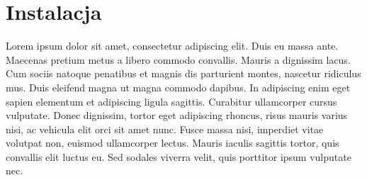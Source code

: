 \section{Instalacja}
Lorem ipsum dolor sit amet, consectetur adipiscing elit. Duis eu massa ante. Maecenas pretium metus a libero commodo convallis. Mauris a dignissim lacus. Cum sociis natoque penatibus et magnis dis parturient montes, nascetur ridiculus mus. Duis eleifend magna ut magna commodo dapibus. In adipiscing enim eget sapien elementum et adipiscing ligula sagittis. Curabitur ullamcorper cursus vulputate. Donec dignissim, tortor eget adipiscing rhoncus, risus mauris varius nisi, ac vehicula elit orci sit amet nunc. Fusce massa nisi, imperdiet vitae volutpat non, euismod ullamcorper lectus. Mauris iaculis sagittis tortor, quis convallis elit luctus eu. Sed sodales viverra velit, quis porttitor ipsum vulputate nec.